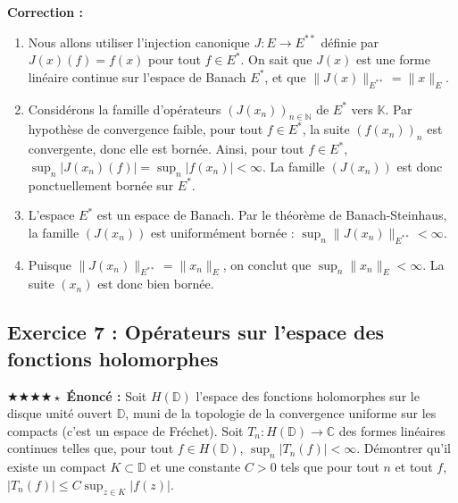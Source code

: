 \documentclass[11pt,a4paper]{article}
\begin{document}
\textbf{Correction :}
\begin{enumerate}
\item Nous allons utiliser l'injection canonique $J : E \to E^{**}$ définie par $J(x)(f) = f(x)$ pour tout $f \in E^*$.
   On sait que $J(x)$ est une forme linéaire continue sur l'espace de Banach $E^*$, et que $\|J(x)\|_{E^{**}} = \|x\|_E$.
\item Considérons la famille d'opérateurs $(J(x_n))_{n \in \mathbb{N}}$ de $E^*$ vers $\mathbb{K}$.
   Par hypothèse de convergence faible, pour tout $f \in E^*$, la suite $(f(x_n))_{n}$ est convergente, donc elle est bornée.
   Ainsi, pour tout $f \in E^*$, $\sup_n |J(x_n)(f)| = \sup_n |f(x_n)| < \infty$.
   La famille $(J(x_n))$ est donc ponctuellement bornée sur $E^*$.
\item L'espace $E^*$ est un espace de Banach. Par le théorème de Banach-Steinhaus, la famille $(J(x_n))$ est uniformément bornée :
   $\sup_n \|J(x_n)\|_{E^{**}} < \infty$.
\item Puisque $\|J(x_n)\|_{E^{**}} = \|x_n\|_E$, on conclut que $\sup_n \|x_n\|_E < \infty$.
   La suite $(x_n)$ est donc bien bornée.
\end{enumerate}
\vspace{1cm}
\subsection*{Exercice 7 : Opérateurs sur l'espace des fonctions holomorphes}
$\bigstar\bigstar\bigstar\bigstar\star$
\textbf{Énoncé :}
Soit $H(\mathbb{D})$ l'espace des fonctions holomorphes sur le disque unité ouvert $\mathbb{D}$, muni de la topologie de la convergence uniforme sur les compacts (c'est un espace de Fréchet).
Soit $T_n : H(\mathbb{D}) \to \mathbb{C}$ des formes linéaires continues telles que, pour tout $f \in H(\mathbb{D})$, $\sup_n |T_n(f)| < \infty$.
Démontrer qu'il existe un compact $K \subset \mathbb{D}$ et une constante $C > 0$ tels que pour tout $n$ et tout $f$, $|T_n(f)| \le C \sup_{z \in K} |f(z)|$.
\end{document}
